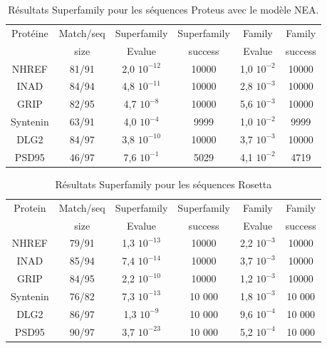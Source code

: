 \begin{table}[h]
       \centering
  \caption{Résultats Superfamily pour les séquences Proteus avec le modèle NEA.}   
  \label{tab:superfamily_model_B6}         
  \begin{tabular}{cccccc}
    
    \toprule
    Protéine & Match/seq & Superfamily & Superfamily & Family & Family \\
            & size      & Evalue      & success     & Evalue & success\\
    \cmidrule{1-6}
    NHREF  & 81/91 &     2,0 $10^{-12}$ & 10000  & 1,0 $10^{-2}$ & 10000  \\
    INAD  & 84/94 &      4,8 $10^{-11}$ & 10000  & 2,8 $10^{-3}$ & 10000  \\
    GRIP  & 82/95 &      4,7 $10^{-8}$  & 10000  & 5,6 $10^{-3}$ & 10000  \\
    Syntenin  & 63/91 &  4,0 $10^{-4}$  &  9999  & 1,0 $10^{-2}$ &  9999  \\
    DLG2  & 84/97 &      3,8 $10^{-10}$ & 10000  & 3,7 $10^{-3}$ & 10000  \\
    PSD95  & 46/97 &     7,6 $10^{-1}$  &  5029  & 4,1 $10^{-2}$ &  4719  \\

    \bottomrule        
  \end{tabular}   
\end{table}
\begin{table}[h]
    \caption{Résultats Superfamily pour les séquences Rosetta}   
    \label{tab:superfamily_bestRE}       
    \centering
  \begin{tabular}{cccccc}
    \toprule
    Protein & Match/seq & Superfamily & Superfamily & Family & Family \\
            & size      & Evalue      & success     & Evalue & success\\
    \cmidrule{1-6}
    NHREF    & 79/91   &    1,3 $10^{-13}$ & 10000 & 2,2 $10^{-3}$ & 10000 \\
    INAD     & 85/94   &    7,4 $10^{-14}$ & 10000 & 3,7 $10^{-3}$ & 10000 \\
    GRIP     & 84/95   &    2,2 $10^{-10}$ & 10000 & 1,2 $10^{-3}$ & 10000 \\
    Syntenin & 76/82   &    7,3 $10^{-13}$ & 10 000 & 1,8 $10^{-3}$ & 10 000 \\
    DLG2     & 86/97   &    1,3 $10^{-9}$  & 10 000 & 9,6 $10^{-4}$ & 10 000 \\
    PSD95    & 90/97   &    3,7 $10^{-23}$ & 10 000 & 5,2 $10^{-4}$ & 10 000 \\
    \bottomrule        
  \end{tabular}   
\end{table}


